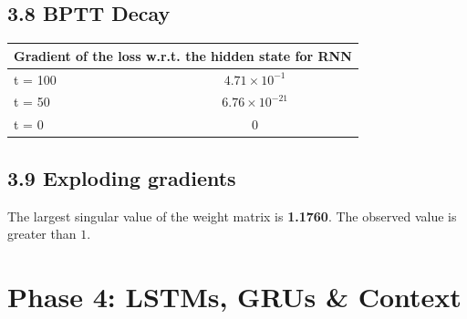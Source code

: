 \documentclass[12pt,a4paper]{article}
\begin{document}
\subsection{3.8 BPTT Decay}
\vspace{6pt}
\begin{resultbox}
\begin{center}
\setlength{\tabcolsep}{3pt} %
\begin{tabular}{lc}
\toprule
\multicolumn{2}{l}{Gradient of the loss w.r.t. the hidden state for RNN} \\
\midrule
t = 100 & $4.71\times 10^{-1}$ \\
t = 50  & $6.76\times 10^{-21}$ \\
t = 0   & 0 \\
\bottomrule
\end{tabular}
\end{center}

\end{resultbox}

\subsection{3.9 Exploding gradients}
\vspace{6pt}
\begin{resultbox}
The largest singular value of the weight matrix is \textbf{1.1760}. The observed value is greater than $1$.
\end{resultbox}

\section{Phase 4: LSTMs, GRUs \& Context}
\end{document}
